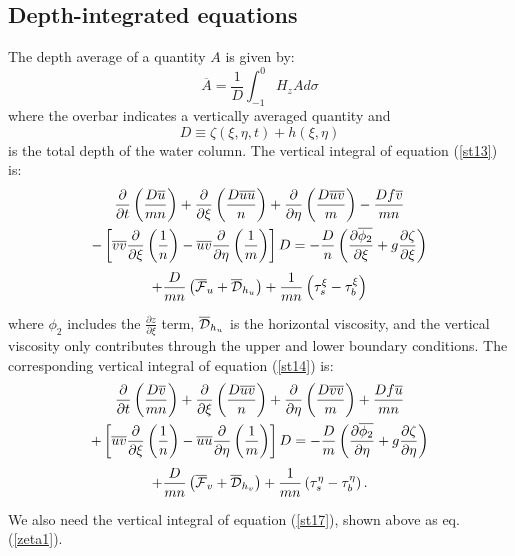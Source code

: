 \subsection{Depth-integrated equations}
\label{Vort}
The depth average of a quantity $A$ is given by:
\begin{equation}
   \overline{A} = \frac{1}{D} \int_{-1}^0 H_z A d\sigma
\end{equation}
where the overbar indicates a vertically averaged quantity and
\begin{equation}
   D \equiv \zeta(\xi, \eta, t) + h(\xi, \eta)
\end{equation}
is the total depth of the water column.  The vertical integral of
equation (\ref{st13}) is:
\begin{multline}
   \frac{\partial}{\partial t} \left( \frac{D \overline{u}}{mn} \right)
   + \frac 
   {\partial}{\partial \xi} \left( \frac{D \overline{uu}}{n} \right )
   + \frac 
   {\partial}{\partial \eta} \left( \frac{D \overline{uv}}{m} \right)
   - \frac{Df\overline{v}}{mn}
\\ \vspace{1mm}
   - \left[ \overline{vv}
   \frac{\partial}{\partial \xi}
   \left( \frac{1}{n} \right) - \overline{uv}
   \frac{\partial}{\partial \eta} \left(
   \frac{1}{m} \right) \right] D = 
   - \frac{D}{n}
   \left( \frac{\partial \overline{\phi_2}}{\partial \xi} +
   g \frac{\partial \zeta}{\partial \xi} \right)
\\ \vspace{1mm}
   + \frac{ D}{mn}
   \left( \overline{\cal F}_u + \overline{\cal D}_{h_u} \right) 
   + \frac{1}{mn} \left( \tau^{\xi}_s - \tau^{\xi}_b \right)
\label{ubar1}
\end{multline}
where $\phi_2$ includes the $\frac{\partial z}{\partial \xi}$ term,
$\overline{\cal D}_{h_u}$ is the horizontal viscosity, and the
vertical viscosity only contributes through the upper and lower
boundary conditions.  The corresponding vertical integral of equation
(\ref{st14}) is:
\begin{multline}
   \frac{\partial}{\partial t} \left( \frac{D \overline{v}}{mn} \right)
   + \frac 
   {\partial}{\partial \xi} \left( \frac{D \overline{uv}}{n} \right )
   + \frac 
   {\partial}{\partial \eta} \left( \frac{D \overline{vv}}{m} \right)
   + \frac{Df\overline{u}}{mn}
\\ \vspace{1mm}
   + \left[ \overline{uv}
   \frac{\partial}{\partial \xi}
   \left( \frac{1}{n} \right) - \overline{uu}
   \frac{\partial}{\partial \eta} \left(
   \frac{1}{m} \right) \right] D = 
   - \frac{D}{m}
   \left( \frac{\partial \overline{\phi_2}}{\partial \eta} +
   g \frac{\partial \zeta}{\partial \eta} \right)
\\ \vspace{1mm}
   + \frac{ D}{mn}
   \left( \overline{\cal F}_v + \overline{\cal D}_{h_v} \right) 
   + \frac{1}{mn} \left( \tau^{\eta}_s - \tau^{\eta}_b \right) .
\label{vbar1}
\end{multline}
We also need the vertical integral of equation (\ref{st17}), shown
above as eq.~ (\ref{zeta1}).

